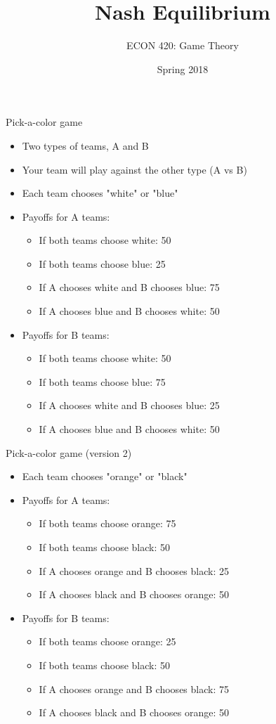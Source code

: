 \documentclass[10pt]{beamer}
\author{ECON 420: Game Theory}
\date{Spring 2018}
\title{Nash Equilibrium}
\begin{document}
\maketitle

\begin{frame}[label={sec:orgf082e89}]{}
\alert{Pick-a-color game}
\begin{itemize}
\item Two types of teams, A and B
\item Your team will play against the other type (A vs B)
\item Each team chooses "white" or "blue"
\item Payoffs for \alert{A} teams:
\begin{itemize}
\item If both teams choose white: 50
\item If both teams choose blue: 25
\item If A chooses white and B chooses blue: 75
\item If A chooses blue and B chooses white: 50
\end{itemize}
\item Payoffs for \alert{B} teams:
\begin{itemize}
\item If both teams choose white: 50
\item If both teams choose blue: 75
\item If A chooses white and B chooses blue: 25
\item If A chooses blue and B chooses white: 50
\end{itemize}
\end{itemize}
\end{frame}

\begin{frame}[label={sec:org5416928}]{}
\alert{Pick-a-color game (version 2)}
\begin{itemize}
\item Each team chooses "orange" or "black"
\item Payoffs for \alert{A} teams:
\begin{itemize}
\item If both teams choose orange: 75
\item If both teams choose black: 50
\item If A chooses orange and B chooses black: 25
\item If A chooses black and B chooses orange: 50
\end{itemize}
\item Payoffs for \alert{B} teams:
\begin{itemize}
\item If both teams choose orange: 25
\item If both teams choose black: 50
\item If A chooses orange and B chooses black: 75
\item If A chooses black and B chooses orange: 50
\end{itemize}
\end{itemize}
\end{frame}
\end{document}
